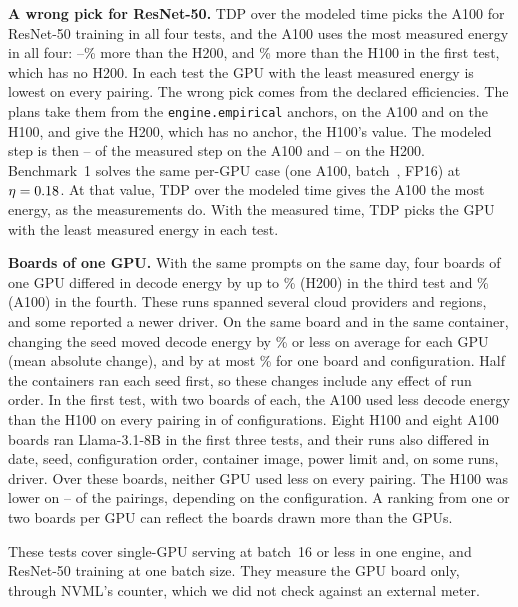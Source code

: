 \documentclass[10pt,twocolumn]{article}
\begin{document}
\textbf{A wrong pick for ResNet-50.} TDP over the modeled time picks the A100 for ResNet-50 training in all four tests, and the A100 uses the most measured energy in all four: \EnergyTrainAhOverHtwoLowPct--\EnergyTrainAhOverHtwoHighPct\% more than the H200, and \EnergyTrainAhOverHhFirstPct\% more than the H100 in the first test, which has no H200. In each test the GPU with the least measured energy is lowest on every pairing. The wrong pick comes from the declared efficiencies. The plans take them from the \texttt{engine.empirical} anchors, \EnergyTrainEtaAh{} on the A100 and \EnergyTrainEtaHh{} on the H100, and give the H200, which has no anchor, the H100's value. The modeled step is then \EnergyTrainStepAhLow--\EnergyTrainStepAhHigh{} of the measured step on the A100 and \EnergyTrainStepHtwoLow--\EnergyTrainStepHtwoHigh{} on the H200. Benchmark~1 solves the same per-GPU case (one A100, batch~\AnchorOnePerGpuBatch{}, FP16) at $\eta=0.18$. At that value, TDP over the modeled time gives the A100 the most energy, as the measurements do. With the measured time, TDP picks the GPU with the least measured energy in each test.

\textbf{Boards of one GPU.} With the same prompts on the same day, four boards of one GPU differed in decode energy by up to \EnergyBoardSpreadMaxPct\% (H200) in the third test and \EnergySeedBoardSpreadMaxPct\% (A100) in the fourth. These runs spanned several cloud providers and regions, and some reported a newer driver. On the same board and in the same container, changing the seed moved decode energy by \EnergySeedShiftMeanPct\% or less on average for each GPU (mean absolute change), and by at most \EnergySeedShiftMaxPct\% for one board and configuration. Half the containers ran each seed first, so these changes include any effect of run order. In the first test, with two boards of each, the A100 used less decode energy than the H100 on every pairing in \EnergyFirstAhClear{} of \EnergyFirstDecodeTotal{} configurations. Eight H100 and eight A100 boards ran Llama-3.1-8B in the first three tests, and their runs also differed in date, seed, configuration order, container image, power limit and, on some runs, driver. Over these boards, neither GPU used less on every pairing. The H100 was lower on \EnergyBoardLowerLow--\EnergyBoardLowerHigh{} of the \EnergyBoardPairs{} pairings, depending on the configuration. A ranking from one or two boards per GPU can reflect the boards drawn more than the GPUs.

These tests cover single-GPU serving at batch~16 or less in one engine, and ResNet-50 training at one batch size. They measure the GPU board only, through NVML's counter, which we did not check against an external meter.
\end{document}
